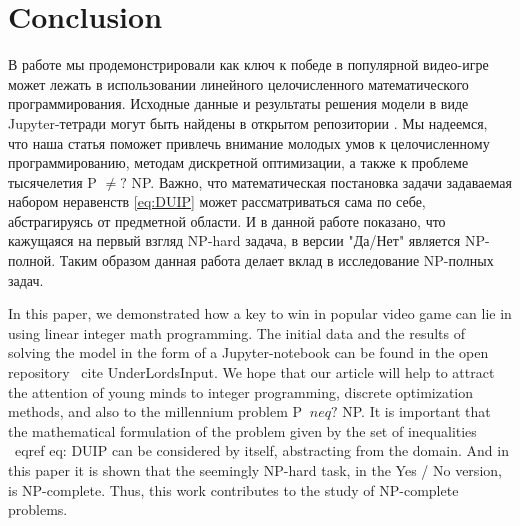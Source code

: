\documentclass{article}
\begin{document}
\section{Conclusion}
\label{SectionConclusion}
В работе мы продемонстрировали как ключ к победе в популярной видео-игре может лежать в использовании линейного целочисленного математического программирования. 
Исходные данные и результаты решения модели в виде Jupyter-тетради могут быть найдены в открытом репозитории \cite{UnderLordsInput}.
Мы надеемся, что наша статья поможет привлечь внимание молодых умов к целочисленному программированию, методам дискретной оптимизации, а также к проблеме тысячелетия P $\neq ?$ NP. 
Важно, что математическая постановка задачи задаваемая набором неравенств \eqref{eq:DUIP} может  рассматриваться сама по себе, абстрагируясь от предметной области. И в данной работе показано, что кажущаяся на первый взгляд NP-hard задача, в версии "Да/Нет" является NP-полной. 
Таким образом данная работа делает вклад в исследование NP-полных задач. 

In this paper, we demonstrated how a key to win in popular video game can lie in using linear integer math programming.
The initial data and the results of solving the model in the form of a Jupyter-notebook can be found in the open repository \ cite {UnderLordsInput}.
We hope that our article will help to attract the attention of young minds to integer programming, discrete optimization methods, and also to the millennium problem P $ \ neq? $ NP.
It is important that the mathematical formulation of the problem given by the set of inequalities \ eqref {eq: DUIP} can be considered by itself, abstracting from the domain. And in this paper it is shown that the seemingly NP-hard task, in the Yes / No version, is NP-complete.
Thus, this work contributes to the study of NP-complete problems.



\end{document}
